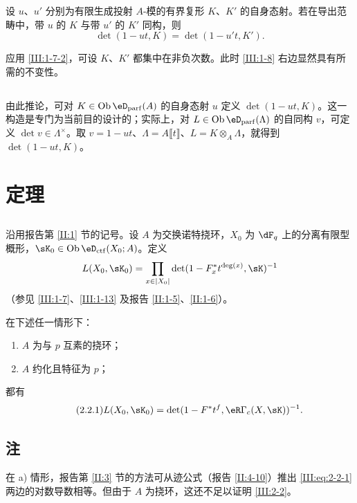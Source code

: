 \begin{corollary_}\label{III:1-13}
设 $u$、$u'$ 分别为有限生成投射 $A$-模的有界复形 $K$、$K'$ 的自身态射。若在导出范畴中，带 $u$ 的 $K$ 与带 $u'$ 的 $K'$ 同构，则
\[\det(1-ut,K)=\det(1-u't,K').\]
\end{corollary_}
应用 \ref{III:1-7-2}，可设 $K$、$K'$ 都集中在非负次数。此时 \ref{III:1-8} 右边显然具有所需的不变性。

\subsection{}\label{III:1-14}
由此推论，可对 $K\in\ob\eD_{\mathrm{parf}}(A)$ 的自身态射 $u$ 定义 $\det(1-ut,K)$。这一构造是专门为当前目的设计的；实际上，对 $L\in\ob\eD_{\mathrm{parf}}(\Lambda)$ 的自同构 $v$，可定义 $\det v\in\Lambda^\times$。取 $v=1-ut$、$\Lambda=A\llbracket t\rrbracket$、$L=K\otimes_A\Lambda$，就得到 $\det(1-ut,K)$。

\section{定理}\label{III:2}
\subsection{}\label{III:2-1}
沿用报告第 \ref{II:1} 节的记号。设 $A$ 为交换诺特挠环，$X_0$ 为 $\dF_q$ 上的分离有限型概形，$\sK_0\in\ob\eD_{\mathrm{ctf}}(X_0;A)$。定义
\[L(X_0,\sK_0)=\prod_{x\in|X_0|}\det(1-F_x^*t^{\deg(x)},\sK)^{-1}\]
（参见 \ref{III:1-7}、\ref{III:1-13} 及报告 \ref{II:1-5}、\ref{II:1-6}）。

\begin{theorem_}\label{III:2-2}
在下述任一情形下：
\begin{enumerate}[\indent a)]
\item $A$ 为与 $p$ 互素的挠环；
\item $A$ 约化且特征为 $p$；
\end{enumerate}
都有
\begin{equation*}\tag{2.2.1}\label{III:eq:2-2-1}
L(X_0,\sK_0)=\det(1-F^*t^f,\eR\Gamma_c(X,\sK))^{-1}.
\end{equation*}
\end{theorem_}

\subsection{注}\label{III:2-3}
在 a) 情形，报告第 \ref{II:3} 节的方法可从迹公式（报告 \ref{II:4-10}）推出 \eqref{III:eq:2-2-1} 两边的对数导数相等。但由于 $A$ 为挠环，这还不足以证明 \ref{III:2-2}。

